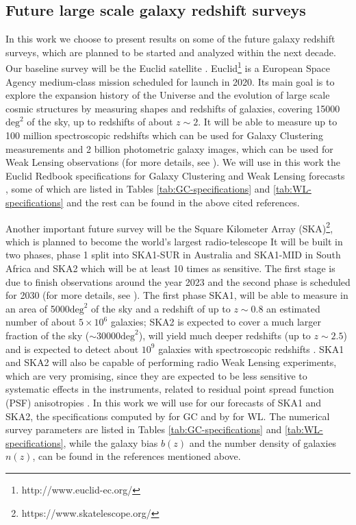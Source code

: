 \subsection{Future large scale galaxy redshift surveys \label{sub:FutureSurveys}}

In this work we choose to present results on some of the future galaxy redshift surveys, which are planned to be started and analyzed within the next decade.
Our baseline survey will be the Euclid satellite \cite{amendola_cosmology_2013, laureijs_euclid_2011}. Euclid\footnote{http://www.euclid-ec.org/} is a European Space Agency medium-class mission scheduled for launch in 2020. Its main goal is to explore the expansion history of the Universe and the evolution of large scale cosmic structures by measuring shapes and redshifts of galaxies, covering 15000$\text{deg}^2$ of the sky, up to redshifts of about $z\sim2$. It will be able to measure up to 100 million spectroscopic redshifts which can be used for Galaxy Clustering measurements and 2 billion photometric galaxy images, which can be used for Weak Lensing observations (for more details, see \cite{amendola_cosmology_2013, laureijs_euclid_2011}). We will use in this work the  Euclid Redbook specifications for Galaxy Clustering and Weak Lensing forecasts \cite{laureijs_euclid_2011}, some of which are listed in Tables \ref{tab:GC-specifications} and \ref{tab:WL-specifications} and the rest can be found in the above cited references.

Another important future survey will be the Square Kilometer Array (SKA)\footnote{https://www.skatelescope.org/}, which is planned to become the world's largest radio-telescope It will be built in two phases, phase 1 split into SKA1-SUR in Australia and SKA1-MID in South Africa and SKA2 which will be at least 10 times as sensitive. The first stage is due to finish observations around the year 2023 and the second phase is scheduled for 2030 (for more details, see \cite{yahya_cosmological_2015,santos_hi_2015,raccanelli_measuring_2015,bull_measuring_2015}). The first phase SKA1, will be able to measure in an area of 5000$\text{deg}^2$ of the sky and a redshift of up to $z\sim0.8$  an estimated number of about $5\times10^6$ galaxies; SKA2 is expected to cover a much larger fraction of the sky ($\sim$30000$\text{deg}^2$), will yield much deeper redshifts (up to $z\sim2.5$) and is expected to detect about $10^9$ galaxies with spectroscopic redshifts \cite{santos_hi_2015}.
SKA1 and SKA2 will also be capable of performing 
radio Weak Lensing experiments, which are very promising, since they are expected to be less sensitive to systematic effects in the instruments, related to residual point spread function (PSF) anisotropies \cite{harrison_ska_2016}.
In this work we will use for our forecasts of SKA1 and SKA2, the specifications computed by \cite{santos_hi_2015} for GC and by \cite{harrison_ska_2016} for WL. The numerical survey parameters are listed in Tables \ref{tab:GC-specifications} and \ref{tab:WL-specifications}, while the galaxy bias $b(z)$ and the number density of galaxies $n(z)$, can be found in the references mentioned above.

